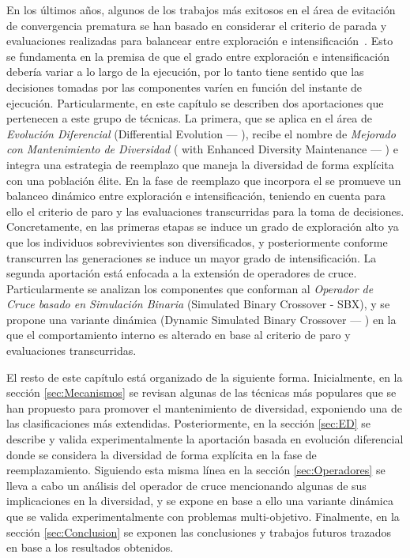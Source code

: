 En los últimos años, algunos de los trabajos más exitosos en el área de evitación de convergencia prematura se han basado en considerar el criterio de parada y evaluaciones
realizadas para balancear entre exploración e intensificación~\cite{segura2016novel}.
%
Esto se fundamenta en la premisa de que el grado entre exploración e intensificación debería variar a lo largo de la ejecución, por lo tanto tiene sentido que las decisiones tomadas por las componentes varíen en función del instante de ejecución.
%
%
Particularmente, en este capítulo se describen dos aportaciones que pertenecen a este grupo de técnicas.
%
La primera, que se aplica en el área de \textit{Evolución Diferencial} (Differential Evolution --- \DE{}), recibe el nombre de \DE{} \textit{Mejorado con Mantenimiento de Diversidad} 
(\DE{} with Enhanced Diversity Maintenance --- \DEEDM{}) e integra una estrategia de reemplazo que maneja la diversidad de forma explícita con una población élite.
%
En la fase de reemplazo que incorpora el \DEEDM{} se promueve un balanceo dinámico entre exploración e intensificación, teniendo en cuenta para ello el criterio de paro
y las evaluaciones transcurridas para la toma de decisiones.
%
Concretamente, en las primeras etapas se induce un grado de exploración alto ya que los individuos sobrevivientes son diversificados, y posteriormente conforme transcurren las 
generaciones se induce un mayor grado de intensificación.
% 
La segunda aportación está enfocada a la extensión de operadores de cruce.
%
Particularmente se analizan los componentes que conforman al \textit{Operador de Cruce basado en Simulación Binaria} (Simulated Binary Crossover - SBX), 
y se propone una variante dinámica (Dynamic Simulated Binary Crossover --- \DSBX{}) en la que el comportamiento interno es alterado en base al criterio de paro y evaluaciones transcurridas.

El resto de este capítulo está organizado de la siguiente forma.
%
Inicialmente, en la sección \ref{sec:Mecanismos} se revisan algunas de las técnicas más populares que se han propuesto para promover el mantenimiento de diversidad, exponiendo una de las clasificaciones más extendidas.
%
Posteriormente, en la sección \ref{sec:ED} se describe y valida experimentalmente la aportación basada en evolución diferencial donde se considera la diversidad de forma explícita en la fase de reemplazamiento.
%
Siguiendo esta misma línea en la sección \ref{sec:Operadores} se lleva a cabo un análisis del operador de cruce \SBX{} mencionando algunas de sus implicaciones en la diversidad, 
y se expone en base a ello una variante dinámica que se valida experimentalmente con problemas multi-objetivo.
%
Finalmente, en la sección \ref{sec:Conclusion} se exponen las conclusiones y trabajos futuros trazados en base a los resultados obtenidos.
%
